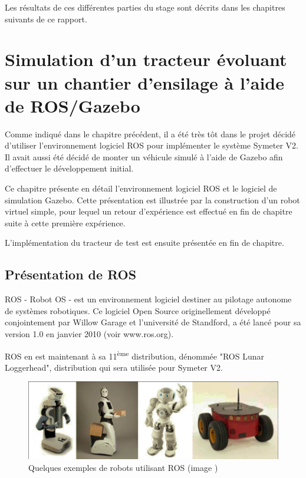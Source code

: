 \documentclass[12pt,a4paper]{report}
\begin{document}
	\para Les résultats de ces différentes parties du stage sont décrits dans les chapitres suivants de ce rapport.
	
				

\chapter{Simulation d'un tracteur évoluant sur un chantier d'ensilage à l'aide de ROS/Gazebo}
\label{chap-simu-ros-gazebo}

Comme indiqué dans le chapitre précédent, il a été très tôt dans le projet décidé d'utiliser l'environnement logiciel ROS pour implémenter le système Symeter V2. Il avait aussi été décidé de monter un véhicule simulé à l'aide de Gazebo afin d'effectuer le développement initial.



\para Ce chapitre présente en détail l'environnement logiciel ROS et le logiciel de simulation Gazebo. Cette présentation est illustrée par la construction d'un robot virtuel simple, pour lequel un retour d'expérience est effectué en fin de chapitre suite à cette première expérience.

\para L'implémentation du tracteur de test est ensuite présentée en fin de chapitre.

	\section{Présentation de ROS}
	
	ROS - Robot OS - est un environnement logiciel destiner au pilotage autonome de systèmes robotiques. Ce logiciel Open Source originellement développé conjointement par Willow Garage et l'université de Standford, a été lancé pour sa version 1.0 en janvier 2010 (voir www.ros.org).
	
	\para ROS en est maintenant à sa 11\textsuperscript{ème} distribution, dénommée "ROS Lunar Loggerhead", distribution qui sera utilisée pour Symeter V2.
	
	\begin{figure}[h!]
		\centering
		\includegraphics[width=0.7\linewidth]{img/robotsros}
		\caption[robotsros]{Quelques exemples de robots utilisant ROS (image \cite{martinez_learning_2013})}
		\label{fig:robotsros}
	\end{figure}
	
\end{document}
